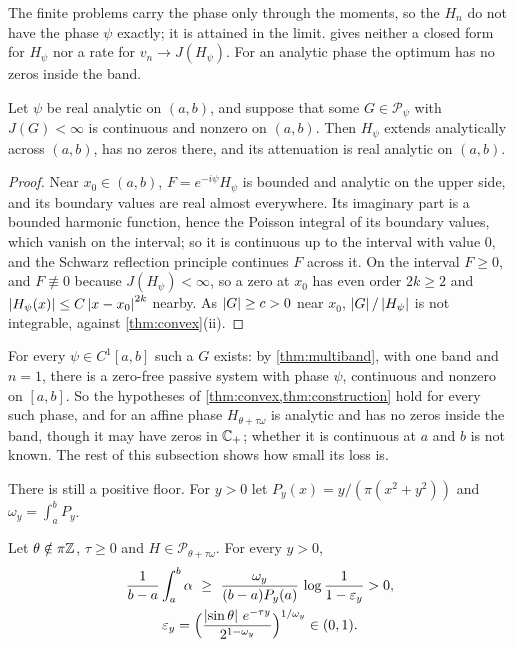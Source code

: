 The finite problems carry the phase only through the moments, so the $H_n$
do not have the phase $\psi$ exactly; it is attained in the limit.
 gives neither a closed form for $H_\psi$ nor a rate
for $v_n\to J(H_\psi)$. For an analytic phase the optimum has no zeros inside
the band.

\begin{theorem}\label{thm:regularity}
Let $\psi$ be real analytic on $(a,b)$, and suppose that some
$G\in\mathcal P_\psi$ with $J(G)<\infty$ is continuous and nonzero on $(a,b)$.
Then $H_\psi$ extends analytically across $(a,b)$, has no zeros there, and
its attenuation is real analytic on $(a,b)$.
\end{theorem}

\begin{proof}
Near $x_0\in(a,b)$, $F=e^{-i\psi}H_\psi$ is bounded and analytic on the upper
side, and its boundary values are real almost everywhere. Its imaginary part
is a bounded harmonic function, hence the Poisson integral of its boundary
values, which vanish on the interval; so it is continuous up to the
interval with value $0$, and the Schwarz reflection principle continues $F$
across it. On the interval $F\ge0$, and $F\not\equiv0$ because
$J(H_\psi)<\infty$, so a zero at $x_0$ has even order $2k\ge2$ and
$\left|H_\psi(x)\right|\le C\left|x-x_0\right|^{2k}$ nearby. As $\left|G\right|\ge c>0$ near $x_0$,
$\left|G\right|/\left|H_\psi\right|$ is not integrable, against \cref{thm:convex}(ii).
\end{proof}

For every $\psi\in C^1[a,b]$ such a $G$ exists: by \cref{thm:multiband}, with one
band and $n=1$, there is a zero-free passive system with phase $\psi$,
continuous and nonzero on $[a,b]$. So the hypotheses of
\cref{thm:convex,thm:construction} hold for every such phase, and for an
affine phase $H_{\theta+\tau\omega}$ is analytic and has no zeros inside the band,
though it may have zeros in $\mathbb C_{+}$; whether it is continuous at $a$ and $b$ is
not known. The rest of this subsection shows how small its loss is.

There is still a positive floor. For $y>0$ let $P_y(x)=y/(\pi(x^2+y^2))$ and
$\omega_y=\int_a^bP_y$.

\begin{theorem}\label{thm:poisson}
Let $\theta\notin\pi\mathbb Z$, $\tau\ge0$ and $H\in\mathcal P_{\theta+\tau\omega}$.
For every $y>0$,
\begin{gather*}
\frac1{b-a}\int_a^b\alpha\ \ge\ \frac{\omega_y}{(b-a)P_y(a)}\,\log\frac1{1-\varepsilon_y}>0,\\
\varepsilon_y=\Big(\frac{\abs{\sin\theta}\,e^{-\tau y}}{2^{1-\omega_y}}\Big)^{1/\omega_y}\in(0,1).
\end{gather*}
\end{theorem}

